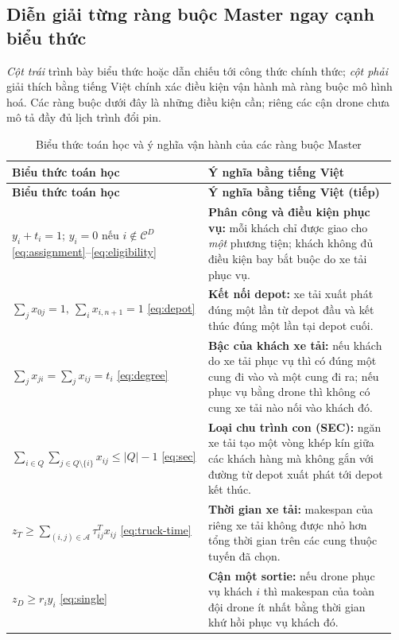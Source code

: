 \documentclass[11pt,a4paper]{article}
\theoremstyle{definition}
\theoremstyle{plain}
\theoremstyle{remark}
\newcommand{\CD}{\mathcal C^D}
\newcommand{\A}{\mathcal A}
\begin{document}
\subsection{Diễn giải từng ràng buộc Master ngay cạnh biểu thức}
\label{subsec:master-meaning}
\noindent\textit{Cột trái} trình bày biểu thức hoặc dẫn chiếu tới công thức chính thức; \textit{cột phải} giải thích bằng tiếng Việt chính xác điều kiện vận hành mà ràng buộc mô hình hoá. Các ràng buộc dưới đây là những điều kiện cần; riêng các cận drone chưa mô tả đầy đủ lịch trình đổi pin.
\begingroup
\small\renewcommand{\arraystretch}{1.33}
\begin{longtable}{@{}p{0.49\linewidth}p{0.47\linewidth}@{}}
\caption{Biểu thức toán học và ý nghĩa vận hành của các ràng buộc Master}\label{tab:master-meaning}\\
\toprule
\textbf{Biểu thức toán học} & \textbf{Ý nghĩa bằng tiếng Việt}\\\midrule
\endfirsthead
\toprule
\textbf{Biểu thức toán học} & \textbf{Ý nghĩa bằng tiếng Việt (tiếp)}\\\midrule
\endhead
\bottomrule
\endfoot
$y_i+t_i=1$; $y_i=0$ nếu $i\notin\CD$ \eqref{eq:assignment}--\eqref{eq:eligibility}
& \textbf{Phân công và điều kiện phục vụ:} mỗi khách chỉ được giao cho \emph{một} phương tiện; khách không đủ điều kiện bay bắt buộc do xe tải phục vụ.\\
$\displaystyle \sum_{j}x_{0j}=1,\ \sum_i x_{i,n+1}=1$ \eqref{eq:depot}
& \textbf{Kết nối depot:} xe tải xuất phát đúng một lần từ depot đầu và kết thúc đúng một lần tại depot cuối.\\
$\displaystyle \sum_{j}x_{ji}=\sum_j x_{ij}=t_i$ \eqref{eq:degree}
& \textbf{Bậc của khách xe tải:} nếu khách do xe tải phục vụ thì có đúng một cung đi vào và một cung đi ra; nếu phục vụ bằng drone thì không có cung xe tải nào nối vào khách đó.\\
$\displaystyle \sum_{i\in Q}\sum_{j\in Q\setminus\{i\}}x_{ij}\le|Q|-1$ \eqref{eq:sec}
& \textbf{Loại chu trình con (SEC):} ngăn xe tải tạo một vòng khép kín giữa các khách hàng mà không gắn với đường từ depot xuất phát tới depot kết thúc.\\
$\displaystyle z_T\ge\sum_{(i,j)\in\A}\tau^T_{ij}x_{ij}$ \eqref{eq:truck-time}
& \textbf{Thời gian xe tải:} makespan của riêng xe tải không được nhỏ hơn tổng thời gian trên các cung thuộc tuyến đã chọn.\\
$\displaystyle z_D\ge r_i y_i$ \eqref{eq:single}
& \textbf{Cận một sortie:} nếu drone phục vụ khách $i$ thì makespan của toàn đội drone ít nhất bằng thời gian khứ hồi phục vụ khách đó.\\

\end{longtable}
\end{document}
